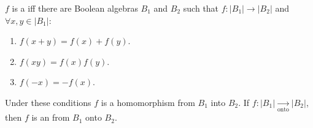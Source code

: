 $f$ is a  iff there are Boolean algebras $B_1$ and $B_2$ such that $f: |B_1| \rightarrow |B_2|$ and $\forall x, y \in |B_1|$:
\begin{enumerate}
\item $f(x + y) = f(x) + f(y)$.
\item $f(xy) = f(x)f(y)$.
\item $f(-x) = -f(x)$.
\end{enumerate}
Under these conditions $f$ is a homomorphism from $B_1$ into $B_2$. If $f: |B_1| \xrightarrow[\text{onto}]{} |B_2|$, then $f$ is an  from $B_1$ onto $B_2$.
